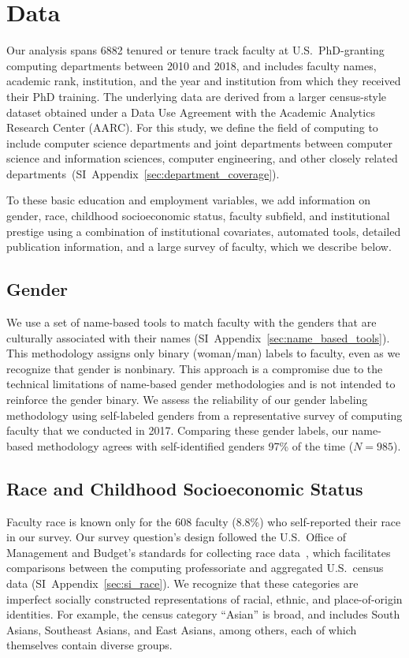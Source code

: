 \documentclass[reprint, twocolumn, aps, nofootinbib, superscriptaddress, longbibliography]{revtex4-1}
\begin{document}
  
\section{Data} \label{sec:data}
Our analysis spans 6882 tenured or tenure track faculty at U.S.~PhD-granting computing departments between 2010 and 2018, and includes faculty names, academic rank, institution, and the year and institution from which they received their PhD training. The underlying data are derived from a larger census-style dataset obtained under a Data Use Agreement with the Academic Analytics Research Center (AARC). For this study, we define the field of computing to include computer science departments and joint departments between computer science and information sciences, computer engineering, and other closely related departments~(SI~Appendix~\ref{sec:department_coverage}). 

To these basic education and employment variables, we add information on gender, race, childhood socioeconomic status, faculty subfield, and institutional prestige using a combination of institutional covariates, automated tools, detailed publication information, and a large survey of faculty, which we describe below. 

\subsection{Gender} 
We use a set of name-based tools to match faculty with the genders that are culturally associated with their names (SI~Appendix~\ref{sec:name_based_tools}). This methodology assigns only binary (woman/man) labels to faculty, even as we recognize that gender is nonbinary. This approach is a compromise due to the technical limitations of name-based gender methodologies and is not intended to reinforce the gender binary. We assess the reliability of our gender labeling methodology using self-labeled genders from a representative survey of computing faculty that we conducted in 2017. Comparing these gender labels, our name-based methodology agrees with self-identified genders 97\% of the time ($N = 985$). 

\subsection{Race and Childhood Socioeconomic Status} 
Faculty race is known only for the 608 faculty (8.8\%) who self-reported their race in our survey. Our survey question's design followed the U.S.~Office of Management and Budget's standards for collecting race data~\cite{office1997revisions}, which facilitates comparisons between the computing professoriate and aggregated U.S.~census data (SI~Appendix~\ref{sec:si_race}). We recognize that these categories are imperfect socially constructed representations of racial, ethnic, and place-of-origin identities. For example, the census category ``Asian'' is broad, and includes South Asians, Southeast Asians, and East Asians, among others, each of which themselves contain diverse groups. 
\end{document}
